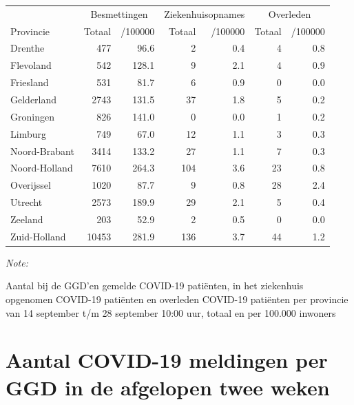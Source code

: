 \documentclass[
  english,
  man,floatsintext]{apa6}
\begin{document}
\begin{table}[H]
\centering
\begin{threeparttable}
\begin{tabular}{lrrrrrr}
\toprule
\multicolumn{1}{c}{ } & \multicolumn{2}{c}{Besmettingen} & \multicolumn{2}{c}{Ziekenhuisopnames} & \multicolumn{2}{c}{Overleden} \\
\cmidrule(l{3pt}r{3pt}){2-3} \cmidrule(l{3pt}r{3pt}){4-5} \cmidrule(l{3pt}r{3pt}){6-7}
Provincie & Totaal & /100000 & Totaal & /100000 & Totaal & /100000\\
\midrule
Drenthe & 477 & 96.6 & 2 & 0.4 & 4 & 0.8\\
Flevoland & 542 & 128.1 & 9 & 2.1 & 4 & 0.9\\
Friesland & 531 & 81.7 & 6 & 0.9 & 0 & 0.0\\
Gelderland & 2743 & 131.5 & 37 & 1.8 & 5 & 0.2\\
Groningen & 826 & 141.0 & 0 & 0.0 & 1 & 0.2\\
Limburg & 749 & 67.0 & 12 & 1.1 & 3 & 0.3\\
Noord-Brabant & 3414 & 133.2 & 27 & 1.1 & 7 & 0.3\\
Noord-Holland & 7610 & 264.3 & 104 & 3.6 & 23 & 0.8\\
Overijssel & 1020 & 87.7 & 9 & 0.8 & 28 & 2.4\\
Utrecht & 2573 & 189.9 & 29 & 2.1 & 5 & 0.4\\
Zeeland & 203 & 52.9 & 2 & 0.5 & 0 & 0.0\\
Zuid-Holland & 10453 & 281.9 & 136 & 3.7 & 44 & 1.2\\
\bottomrule
\end{tabular}
\begin{tablenotes}
\item \textit{Note: } 
\item Aantal bij de GGD’en gemelde COVID-19 patiënten, in het ziekenhuis opgenomen COVID-19 patiënten en overleden COVID-19 patiënten per provincie van 14 september t/m 28 september 10:00 uur, totaal en per 100.000 inwoners
\end{tablenotes}
\end{threeparttable}
\end{table}

\newpage

\hypertarget{aantal-covid-19-meldingen-per-ggd-in-de-afgelopen-twee-weken}{%
\section{Aantal COVID-19 meldingen per GGD in de afgelopen twee weken}\label{aantal-covid-19-meldingen-per-ggd-in-de-afgelopen-twee-weken}}
\end{document}
